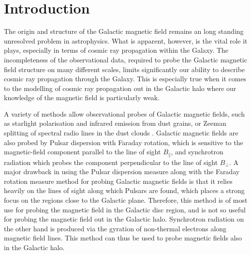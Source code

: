 \documentclass[12pt, a4 paper]{article}
\date{ }
\begin{document}

\tableofcontents
\newpage

\section{Introduction}

The origin and structure of the Galactic magnetic field remains an long standing unresolved problem in astrophysics. What is apparent, however, is the vital role it plays, especially in terms of cosmic ray propagation within the Galaxy. The incompleteness of the observational data, required to probe the Galactic magnetic field structure on many different scales, limits significantly our ability to describe cosmic ray propagation through the Galaxy. This is especially true when it comes to the modelling of cosmic ray propagation out in the Galactic halo where our knowledge of the magnetic field is particularly weak.

A variety of methods allow observational probes of Galactic magnetic fields, such as starlight polarisation and infrared emission from dust grains, or Zeeman splitting of spectral radio lines in the dust clouds \textcolor{blue}{\cite{Beck_2007}}. Galactic magnetic fields are also probed by Pulsar dispersion with Faraday rotation, which is sensitive to the magnetic-field component parallel to the line of sight $B_{\parallel}$, and synchrotron radiation which probes the component perpendicular to the line of sight $B_{\perp}$. A major drawback in using the Pulsar dispersion measure along with the Faraday rotation measure method for probing Galactic magnetic fields is that it relies heavily on the lines of sight along which Pulsars are found, which places a strong focus on the regions close to the Galactic plane. Therefore, this method is of most use for probing the magnetic field in the Galactic disc region, and is not so useful for probing the magnetic field out in the Galactic halo. Synchrotron radiation on the other hand is produced via the gyration of non-thermal electrons along magnetic field lines. This method can thus be used to probe magnetic fields also in the Galactic halo.
\end{document}

